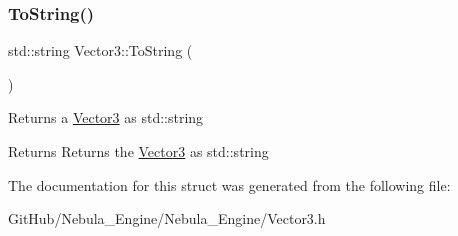 \subsubsection{\texorpdfstring{ToString()}{ToString()}}
{\footnotesize\ttfamily std\+::string Vector3\+::\+To\+String (\begin{DoxyParamCaption}{ }\end{DoxyParamCaption})\hspace{0.3cm}{\ttfamily [inline]}}

Returns a \mbox{\hyperlink{struct_vector3}{Vector3}} as std\+::string \begin{DoxyReturn}{Returns}
Returns the \mbox{\hyperlink{struct_vector3}{Vector3}} as std\+::string 
\end{DoxyReturn}


The documentation for this struct was generated from the following file\+:\begin{DoxyCompactItemize}
\item 
Git\+Hub/\+Nebula\+\_\+\+Engine/\+Nebula\+\_\+\+Engine/Vector3.\+h\end{DoxyCompactItemize}
